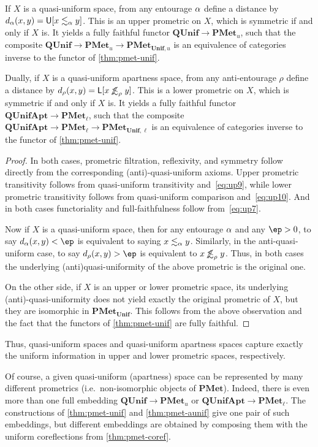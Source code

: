\documentclass{article}
\def\U[#1]{\mathsf{U}[#1]}
\def\L[#1]{\mathsf{L}[#1]}
\def\oapt{\mathrel{\!\not\,\not\lesssim}}
\def\leapx{\lesssim}
\def\ent#1{\leapx_{#1}}
\def\aent#1{\oapt_{#1}}
\def\PMet{\mathbf{PMet}}
\def\PMetUnif{\mathbf{PMet}_{\mathbf{Unif}}}
\def\PMetu{\mathbf{PMet}_u}
\def\PMetl{\mathbf{PMet}_\ell}
\def\PMetUnifu{\mathbf{PMet}_{\mathbf{Unif},u}}
\def\PMetUnifl{\mathbf{PMet}_{\mathbf{Unif},\ell}}
\def\QUnif{\mathbf{QUnif}}
\def\QUnifApt{\mathbf{QUnifApt}}
\begin{document}
\begin{thm}\label{thm:pmet-aunif}
  If $X$ is a quasi-uniform space, from any entourage $\alpha$ define a distance by $d_\al(x,y) = \U[x\ent\al y]$.
  This is an upper prometric on $X$, which is symmetric if and only if $X$ is.
  It yields a fully faithful functor $\QUnif \to \PMetu$, such that the composite $\QUnif \to \PMetu \to \PMetUnifu$ is an equivalence of categories inverse to the functor of \cref{thm:pmet-unif}.

  Dually, if $X$ is a quasi-uniform apartness space, from any anti-entourage $\rho$ define a distance by $d_\rho(x,y) = \L[x\aent\rho y]$.
  This is a lower prometric on $X$, which is symmetric if and only if $X$ is.
  It yields a fully faithful functor $\QUnifApt \to \PMetl$, such that the composite $\QUnifApt \to \PMetl \to \PMetUnifl$ is an equivalence of categories inverse to the functor of \cref{thm:pmet-unif}.
\end{thm}
\begin{proof}
  In both cases, prometric filtration, reflexivity, and symmetry follow directly from the corresponding (anti)-quasi-uniform axioms.
  Upper prometric transitivity follows from quasi-uniform transitivity and~\eqref{eq:up9}, while lower prometric transitivity follows from quasi-uniform comparison and~\eqref{eq:up10}.
  And in both cases functoriality and full-faithfulness follow from~\eqref{eq:up7}.

  Now if $X$ is a quasi-uniform space, then for any entourage $\alpha$ and any $\ep>0$, to say $d_\al(x,y)<\ep$ is equivalent to saying $x\ent\al y$.
  Similarly, in the anti-quasi-uniform case, to say $d_\rho(x,y)>\ep$ is equivalent to $x\aent\rho y$.
  Thus, in both cases the underlying (anti)quasi-uniformity of the above prometric is the original one.

  On the other side, if $X$ is an upper or lower prometric space, its underlying (anti)-quasi-uniformity does not yield exactly the original prometric of $X$, but they are isomorphic in $\PMetUnif$.
  This follows from the above observation and the fact that the functors of \cref{thm:pmet-unif} are fully faithful.
\end{proof}

Thus, quasi-uniform spaces and quasi-uniform apartness spaces capture exactly the uniform information in upper and lower prometric spaces, respectively.

Of course, a given quasi-uniform (apartness) space can be represented by many different prometrics (i.e.\ non-isomorphic objects of $\PMet$).
Indeed, there is even more than one full embedding $\QUnif \to \PMetu$ or $\QUnifApt \to \PMetl$.
The constructions of \cref{thm:pmet-unif} and \cref{thm:pmet-aunif} give one pair of such embeddings, but different embeddings are obtained by composing them with the uniform coreflections from \cref{thm:pmet-coref}.
\end{document}
